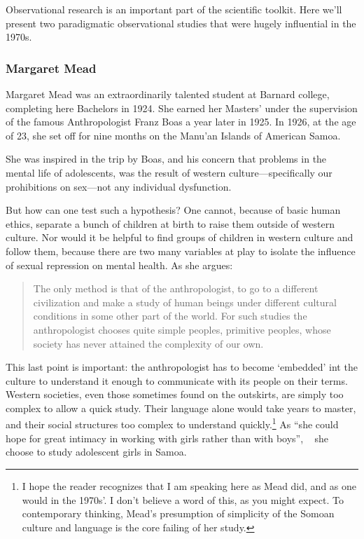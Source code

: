 \begin{refsection}
Observational research is an important part of the scientific toolkit. Here we’ll present two paradigmatic observational studies that were hugely influential in the 1970s.

\subsubsection{Margaret Mead}
\label{margaretmead}

Margaret Mead was an extraordinarily talented student at Barnard college, completing here Bachelors in 1924. She earned her Masters’ under the supervision of the famous Anthropologist Franz Boas a year later in 1925. In 1926, at the age of 23, she set off for nine months on the Manu’an Islands of American Samoa. 

She was inspired in the trip by Boas, and his concern that problems in the mental life of adolescents, was the result of western culture---specifically our prohibitions on sex---not any individual dysfunction. 

But how can one test such a hypothesis? One cannot, because of basic human ethics, separate a bunch of children at birth to raise them outside of western culture. Nor would it be helpful to find groups of children in western culture and follow them, because there are two many variables at play to isolate the influence of sexual repression on mental health. As she argues:

\begin{quote}

The only method is that of the anthropologist, to go to a different civilization and make a study of human beings under different cultural conditions in some other part of the world. For such studies the anthropologist chooses quite simple peoples, primitive peoples, whose society has never attained the complexity of our own. 
\end{quote}

This last point is important: the anthropologist has to become ‘embedded’ int the culture to understand it enough to communicate with its people on their terms. Western societies, even those sometimes found on the outskirts, are simply too complex to allow a quick study. Their language alone would take years to master, and their social structures too complex to understand quickly.\footnote{I hope the reader recognizes that I am speaking here as Mead did, and as one would in the 1970s’. I don’t believe a word of this, as you might expect. To contemporary thinking, Mead’s presumption of simplicity of the Somoan culture and language is the core failing of her study.} As “she could hope for great intimacy in working with girls rather than with boys”, ~\citep[p. 9]{Mead:1928uk} she choose to study adolescent girls in Samoa.


\end{refsection}

